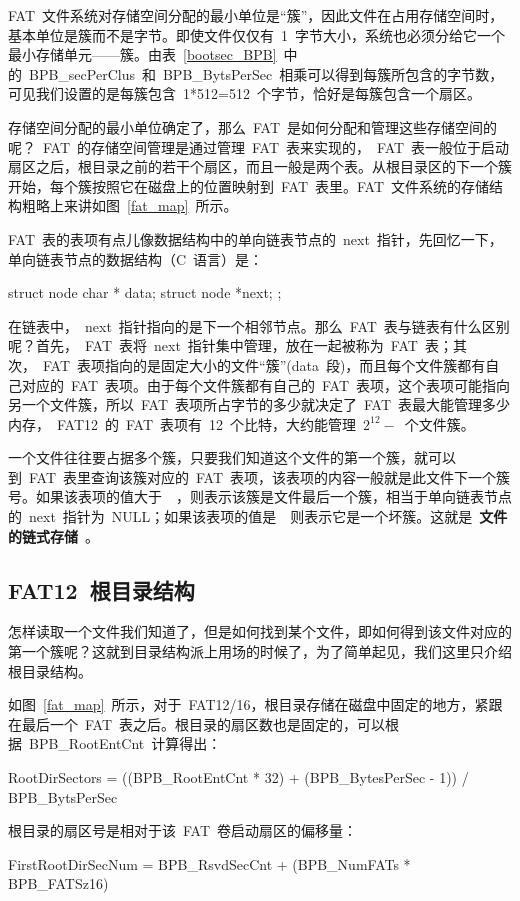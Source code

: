 FAT~文件系统对存储空间分配的最小单位是“簇”，因此文件在占用存储空间时，基本单位是簇而不是字节。即使文件仅仅有~1~字节大小，系统也必须分给它一个最小存储单元——簇。由表~\ref{bootsec_BPB}~中的~BPB\_secPerClus~和~BPB\_BytsPerSec~相乘可以得到每簇所包含的字节数，可见我们设置的是每簇包含~1*512=512~个字节，恰好是每簇包含一个扇区。

存储空间分配的最小单位确定了，那么~FAT~是如何分配和管理这些存储空间的呢？~FAT~的存储空间管理是通过管理~FAT~表来实现的，~FAT~表一般位于启动扇区之后，根目录之前的若干个扇区，而且一般是两个表。从根目录区的下一个簇开始，每个簇按照它在磁盘上的位置映射到~FAT~表里。FAT~文件系统的存储结构粗略上来讲如图~\ref{fat_map}~所示。


FAT~表的表项有点儿像数据结构中的单向链表节点的~next~指针，先回忆一下，单向链表节点的数据结构（C~语言）是：

\begin{Command}
struct node {
  char * data;
  struct node *next;
};
\end{Command}
在链表中，~next~指针指向的是下一个相邻节点。那么~FAT~表与链表有什么区别呢？首先，~FAT~表将~next~指针集中管理，放在一起被称为~FAT~表；其次，~FAT~表项指向的是固定大小的文件“簇”(data~段)，而且每个文件簇都有自己对应的~FAT~表项。由于每个文件簇都有自己的~FAT~表项，这个表项可能指向另一个文件簇，所以~FAT~表项所占字节的多少就决定了~FAT~表最大能管理多少内存，~FAT12~的~FAT~表项有~12~个比特，大约能管理~$2^{12}-$~个文件簇。

一个文件往往要占据多个簇，只要我们知道这个文件的第一个簇，就可以到~FAT~表里查询该簇对应的~FAT~表项，该表项的内容一般就是此文件下一个簇号。如果该表项的值大于~~，则表示该簇是文件最后一个簇，相当于单向链表节点的~next~指针为~NULL；如果该表项的值是~~则表示它是一个坏簇。这就是~\textbf{文件的链式存储}~。

\subsection{FAT12~根目录结构}

怎样读取一个文件我们知道了，但是如何找到某个文件，即如何得到该文件对应的第一个簇呢？这就到目录结构派上用场的时候了，为了简单起见，我们这里只介绍根目录结构。

如图~\ref{fat_map}~所示，对于~FAT12/16，根目录存储在磁盘中固定的地方，紧跟在最后一个~FAT~表之后。根目录的扇区数也是固定的，可以根据~BPB\_RootEntCnt~计算得出：
\begin{Command}
RootDirSectors = ((BPB_RootEntCnt * 32) + (BPB_BytesPerSec - 1)) / BPB_BytsPerSec
\end{Command}
根目录的扇区号是相对于该~FAT~卷启动扇区的偏移量：
\begin{Command}
FirstRootDirSecNum = BPB_RsvdSecCnt + (BPB_NumFATs * BPB_FATSz16)
\end{Command}

